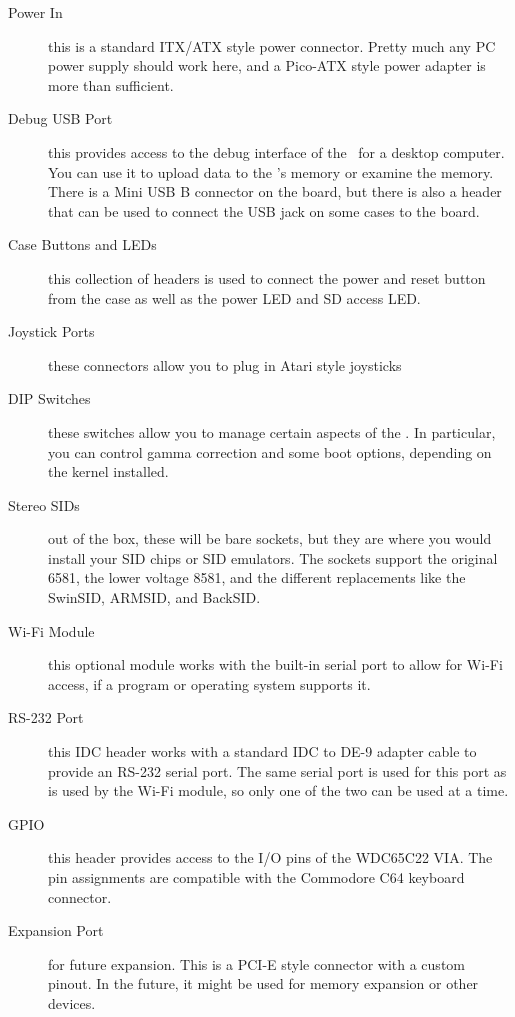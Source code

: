 \begin{description}
    \item[Power In] this is a standard ITX/ATX style power connector. Pretty much any PC power supply should work here, and a Pico-ATX style power adapter is more than sufficient.

    \item[Debug USB Port] this provides access to the debug interface of the \jr\ for a desktop computer. You can use it to upload data to the \jr's memory or examine the memory. There is a Mini USB B connector on the board, but there is also a header that can be used to connect the USB jack on some cases to the board.

    \item[Case Buttons and LEDs] this collection of headers is used to connect the power and reset button from the case as well as the power LED and SD access LED.

    \item[Joystick Ports] these connectors allow you to plug in Atari style joysticks

    \item[DIP Switches] these switches allow you to manage certain aspects of the \jr. In particular, you can control gamma correction and some boot options, depending on the kernel installed.

    \item[Stereo SIDs] out of the box, these will be bare sockets, but they are where you would install your SID chips or SID emulators. The sockets support the original 6581, the lower voltage 8581, and the different replacements like the SwinSID, ARMSID, and BackSID.

    \item[Wi-Fi Module] this optional module works with the built-in serial port to allow for Wi-Fi access, if a program or operating system supports it.

    \item[RS-232 Port] this IDC header works with a standard IDC to DE-9 adapter cable to provide an RS-232 serial port. The same serial port is used for this port as is used by the Wi-Fi module, so only one of the two can be used at a time.

    \item[GPIO] this header provides access to the I/O pins of the WDC65C22 VIA. The pin assignments are compatible with the Commodore C64 keyboard connector.

    \item[Expansion Port] for future expansion. This is a PCI-E style connector with a custom pinout. In the future, it might be used for memory expansion or other devices.


\end{description}
